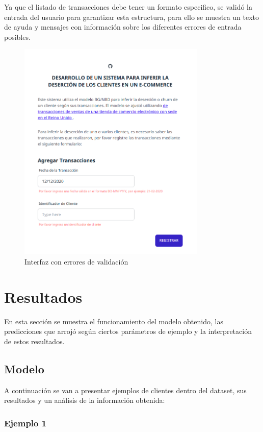 Ya que el listado de transacciones debe tener un formato especifico, se validó la entrada del usuario para garantizar esta estructura, para ello se muestra un texto de ayuda y mensajes con información sobre los diferentes errores de entrada posibles.

\begin{figure}[H]
	\centering \includegraphics[width=0.80\textwidth]{images/6.png}
	\caption{Interfaz con errores de validación}
	\label{fig:ui1}
\end{figure}

\section{Resultados}

En esta sección se muestra el funcionamiento del modelo obtenido, las predicciones que arrojó según ciertos parámetros de ejemplo y la interpretación de estos resultados.

\subsection{Modelo}

A continuación se van a presentar ejemplos de clientes dentro del dataset, sus resultados y un análisis de la información obtenida:

\subsubsection{Ejemplo 1}

